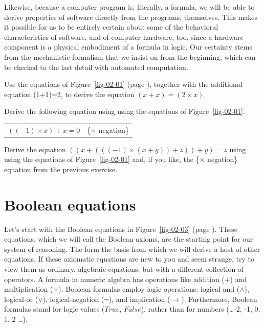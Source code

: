 Likewise, because a computer program is,
literally, a formula, we will be able to derive
properties of software directly from the programs, themselves.
This makes it possible for us to be entirely
certain about some of the behavioral characteristics of
software, and of computer hardware, too,
since a hardware component is a physical embodiment of a formula
in logic.
Our certainty stems from the mechanistic
formalism that we insist on from the beginning,
which can be checked to the last detail with automated computation.

\begin{ExerciseList}
\label{ex:ch02-intro}
\Exercise
Use the equations of Figure~\ref{fig-02-01} (page \pageref{fig-02-01}),
together with the additional equation (1+1)=2, to derive the equation $(x + x) = (2 \times x)$.

\Exercise
Derive the following equation
using using the equations of Figure~\ref{fig-02-01}.
\begin{center}
\begin{tabular}{ll}
$((-1) \times x) + x = 0$    & \{$\times$ negation\}
\end{tabular}
\end{center}

\Exercise
Derive the equation $((x + (((-1) \times (x + y)) + z)) + y) = z$
using using the equations of Figure~\ref{fig-02-01} and,
if you like,
the \{$\times$ negation\} equation from the previous exercise.
\end{ExerciseList}

\section{Boolean equations}
\label{sec:boolean-equations}
Let's start with the Boolean equations in
Figure~\ref{fig-02-03} (page \pageref{fig-02-03}).
These equations, which we will call the Boolean axioms,
are the starting point for our system of reasoning.
The form the basis from which we will derive
a host of other equations.
If these axiomatic equations are new to you and seem strange,
try to view them as ordinary,
algebraic equations, but with a different collection of operators.
A formula in numeric algebra has operations like addition
($+$) and multiplication ($\times$). Boolean formulas employ logic
operations: logical-and ($\wedge$), logical-or ($\vee$),
logical-negation ($\neg$), and implication ($\rightarrow$).
Furthermore, Boolean formulas stand for logic values
($True$, $False$), rather than for numbers (\dots -2, -1, 0, 1, 2 \dots).

